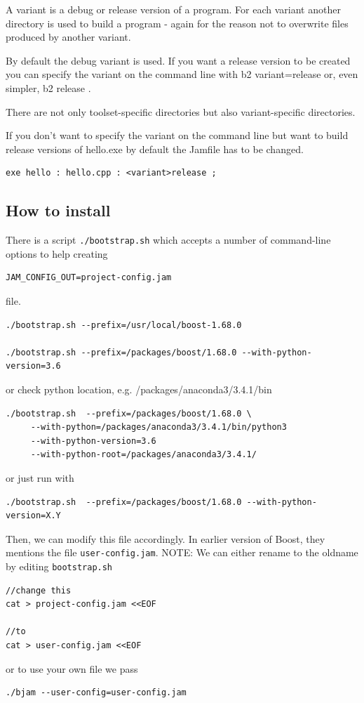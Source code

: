 A variant is a debug or release version of a program. For each variant another
directory is used to build a program - again for the reason not to overwrite
files produced by another variant.

By default the debug variant is used. If you want a release version to be
created you can specify the variant on the command line with b2 variant=release
or, even simpler, b2 release .

There are not only toolset-specific directories but also variant-specific
directories.


If you don't want to specify the variant on the command line but want to build
release versions of hello.exe by default the Jamfile has to be changed.
\begin{verbatim}
exe hello : hello.cpp : <variant>release ; 
\end{verbatim}

\subsection{How to install}

There is a script \verb!./bootstrap.sh! which accepts a number of command-line options to help creating 
\begin{verbatim}
JAM_CONFIG_OUT=project-config.jam
\end{verbatim}
file. 

\begin{verbatim}
./bootstrap.sh --prefix=/usr/local/boost-1.68.0

./bootstrap.sh --prefix=/packages/boost/1.68.0 --with-python-version=3.6

\end{verbatim}

or check python location, e.g. /packages/anaconda3/3.4.1/bin
\begin{verbatim}
./bootstrap.sh  --prefix=/packages/boost/1.68.0 \
     --with-python=/packages/anaconda3/3.4.1/bin/python3
     --with-python-version=3.6
     --with-python-root=/packages/anaconda3/3.4.1/

\end{verbatim}
or just run with 
\begin{verbatim}
./bootstrap.sh  --prefix=/packages/boost/1.68.0 --with-python-version=X.Y
\end{verbatim}


Then, we can modify this file accordingly. In earlier version of Boost, they
mentions the file \verb!user-config.jam!.
NOTE: We can either rename to the oldname by editing \verb!bootstrap.sh!
\begin{verbatim}
//change this
cat > project-config.jam <<EOF

//to
cat > user-config.jam <<EOF
\end{verbatim} 
or to use your own file we pass
\begin{verbatim}
./bjam --user-config=user-config.jam
\end{verbatim}

